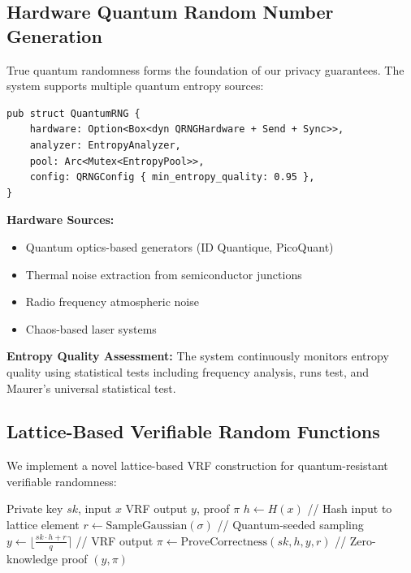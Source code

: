 \documentclass[12pt,a4paper]{article}
\begin{document}
\subsection{Hardware Quantum Random Number Generation}

True quantum randomness forms the foundation of our privacy guarantees. The system supports multiple quantum entropy sources:

\begin{lstlisting}[style=rustcode, caption=Quantum RNG Implementation]
pub struct QuantumRNG {
    hardware: Option<Box<dyn QRNGHardware + Send + Sync>>,
    analyzer: EntropyAnalyzer,
    pool: Arc<Mutex<EntropyPool>>,
    config: QRNGConfig { min_entropy_quality: 0.95 },
}
\end{lstlisting}

\textbf{Hardware Sources:}
\begin{itemize}
\item Quantum optics-based generators (ID Quantique, PicoQuant)
\item Thermal noise extraction from semiconductor junctions
\item Radio frequency atmospheric noise
\item Chaos-based laser systems
\end{itemize}

\textbf{Entropy Quality Assessment:} The system continuously monitors entropy quality using statistical tests including frequency analysis, runs test, and Maurer's universal statistical test.

\subsection{Lattice-Based Verifiable Random Functions}

We implement a novel lattice-based VRF construction for quantum-resistant verifiable randomness:

\begin{algorithm}
\caption{Lattice-Based VRF Evaluation}
\begin{algorithmic}[1]
\REQUIRE Private key $sk$, input $x$
\ENSURE VRF output $y$, proof $\pi$
\STATE $h \leftarrow H(x)$ // Hash input to lattice element
\STATE $r \leftarrow \text{SampleGaussian}(\sigma)$ // Quantum-seeded sampling
\STATE $y \leftarrow \lfloor \frac{sk \cdot h + r}{q} \rceil$ // VRF output
\STATE $\pi \leftarrow \text{ProveCorrectness}(sk, h, y, r)$ // Zero-knowledge proof
\RETURN $(y, \pi)$
\end{algorithmic}
\end{algorithm}
\end{document}

